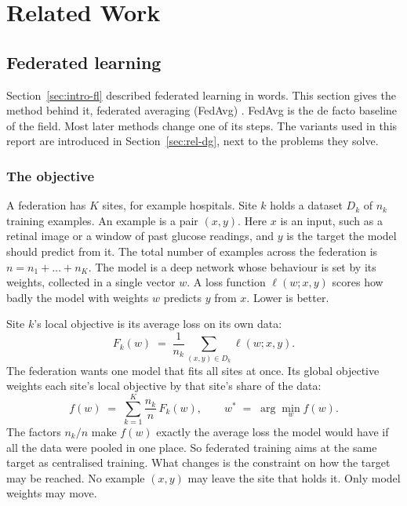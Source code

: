 \chapter{Related Work}
\label{ch:related}

\section{Federated learning}
\label{sec:rel-fl}

Section~\ref{sec:intro-fl} described federated learning in words. This section gives the method behind it, federated averaging (FedAvg) \citep{mcmahan2017fedavg}. FedAvg is the de facto baseline of the field. Most later methods change one of its steps. The variants used in this report are introduced in Section~\ref{sec:rel-dg}, next to the problems they solve.

\subsection{The objective}

A federation has $K$ sites, for example hospitals. Site $k$ holds a dataset $D_k$ of $n_k$ training examples. An example is a pair $(x, y)$. Here $x$ is an input, such as a retinal image or a window of past glucose readings, and $y$ is the target the model should predict from it. The total number of examples across the federation is $n = n_1 + \dots + n_K$. The model is a deep network whose behaviour is set by its weights, collected in a single vector $w$. A loss function $\ell(w; x, y)$ scores how badly the model with weights $w$ predicts $y$ from $x$. Lower is better.

Site $k$'s local objective is its average loss on its own data:
\begin{equation}
\label{eq:fl-local}
F_k(w) \;=\; \frac{1}{n_k} \sum_{(x, y) \in D_k} \ell(w; x, y).
\end{equation}
The federation wants one model that fits all sites at once. Its global objective weights each site's local objective by that site's share of the data:
\begin{equation}
\label{eq:fl-global}
f(w) \;=\; \sum_{k=1}^{K} \frac{n_k}{n} \, F_k(w),
\qquad
w^{*} \;=\; \arg\min_{w} f(w).
\end{equation}
The factors $n_k / n$ make $f(w)$ exactly the average loss the model would have if all the data were pooled in one place. So federated training aims at the same target as centralised training. What changes is the constraint on how the target may be reached. No example $(x, y)$ may leave the site that holds it. Only model weights may move.


